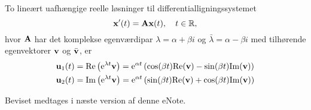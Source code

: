 \begin{method} \label{saet.diffsys.kompleks1}
To lineært uafhængige reelle løsninger til differentialligningssystemet
\begin{equation}
\mathbf{x}'(t) = \mathbf{A} \mathbf{x}(t), \quad t \in \mathbb{R},
\end{equation}
hvor $ \mathbf{A} $ har det komplekse egenværdipar $ \lambda = \alpha + \beta i $ og $ \bar{\lambda} = \alpha - \beta i $ med tilhørende egenvektorer $ \mathbf{v} $ og $ \bar{\mathbf{v}} $, er
\begin{equation}
\begin{aligned}
\mathbf u_1(t) &= \mathrm{Re}\left(\mathrm{e}^{\lambda t} \mathbf{v} \right) = \mathrm{e}^{\alpha t} \left(\cos(\beta t) \mathrm{Re}(\mathbf{v}) - \sin(\beta t) \mathrm{Im}(\mathbf{v}) \right) \\
\mathbf u_2(t) &= \mathrm{Im}\left(\mathrm{e}^{\lambda t} \mathbf{v} \right) = \mathrm{e}^{\alpha t} \left(\sin(\beta t) \mathrm{Re}(\mathbf{v}) + \cos(\beta t) \mathrm{Im}(\mathbf{v}) \right)
\end{aligned}
\end{equation}
\end{method}

Beviset medtages i næste version af denne eNote.

